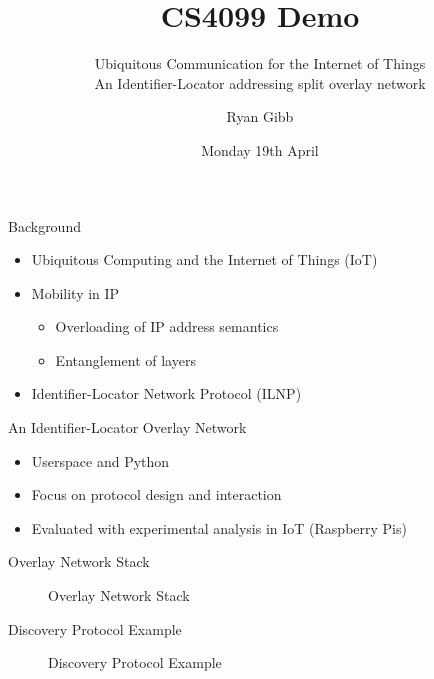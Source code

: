 \documentclass{beamer}
\title{CS4099 Demo}
\subtitle{Ubiquitous Communication for the Internet of Things\\An Identifier-Locator addressing split overlay network}
\author{Ryan Gibb}
\institute{School of Computer Science\\University of St Andrews}
\date{Monday 19th April}
\begin{document}
\begin{frame}
	\maketitle
\end{frame}

\begin{frame}{Background}
\begin{itemize}
    \item Ubiquitous Computing and the Internet of Things (IoT)
    \pause
    \item Mobility in IP
    \pause
    \begin{itemize}
        \item Overloading of IP address semantics
        \item Entanglement of layers
    \end{itemize}
    \pause
    \item Identifier-Locator Network Protocol (ILNP)
\end{itemize}
\end{frame}

\begin{frame}{An Identifier-Locator Overlay Network}
\begin{itemize}
    \item Userspace and Python
    \pause
    \item Focus on protocol design and interaction
    \pause
    \item Evaluated with experimental analysis in IoT (Raspberry Pis)
\end{itemize}
\end{frame}

\begin{frame}{Overlay Network Stack}
\begin{figure}[ht]
    \centering
    \scalebox{0.75}{}
    \caption{Overlay Network Stack}
    \label{fig:network_stack}
\end{figure}
\end{frame}



\begin{frame}{Discovery Protocol Example}
\begin{figure}[ht]
    \centering
    \caption{Discovery Protocol Example}
    \label{fig:discovery}
\end{figure}
\end{frame}
\end{document}
